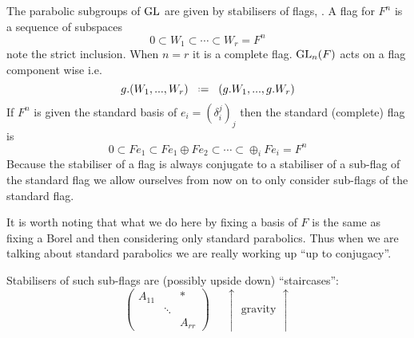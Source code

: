 \begin{example}[\(\GL_n\)]
    The parabolic subgroups of \(\operatorname{GL}\) are given by stabilisers of flags, \cite[Exercise 3.2.16, 6.2.11]{springerLinearAlgebraicGroups1998}\cite{conradStandardParabolicSubgroups}.
    A flag for \(F^n\) is a sequence of subspaces
    \[0\subset W_1 \subset \cdots \subset W_r = F^n\]
    note the strict inclusion. When \(n = r\) it is a complete flag. \(\operatorname{GL}_n(F)\) acts on a flag component wise i.e. 
    \[g.(W_1, ..., W_r) \defeq (g.W_1, ..., g.W_r)\]
    If \(F^n\) is given the standard basis of \(e_i = (\delta_i^j)_j\) then the standard (complete) flag is 
    \[0 \subset Fe_1 \subset Fe_1 \oplus Fe_2 \subset \cdots \subset \oplus_i Fe_i = F^n\]
    Because the stabiliser of a flag is always conjugate to a stabiliser of a sub-flag of the standard flag we allow ourselves from now on to only consider sub-flags of the standard flag. 
    
    \begin{Remark}
        It is worth noting that what we do here by fixing a basis of \(F\) is the same as fixing a Borel and then considering only standard parabolics. Thus when we are talking about standard parabolics we are really working up ``up to conjugacy''.
    \end{Remark}
    
    Stabilisers of such sub-flags are (possibly upside down) ``staircases'':
    \[\begin{pmatrix}
        A_{11} && \ast\\
         & \ddots & \\
         && A_{rr} 
    \end{pmatrix}   \;\;\;\;\; \uparrow \text{ gravity }\uparrow \]


\end{example}
